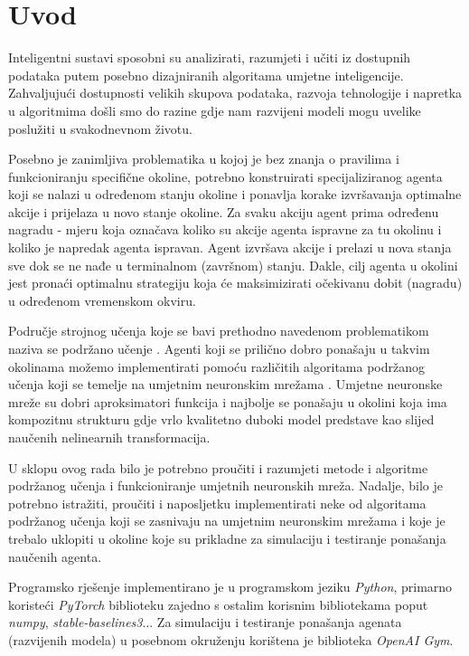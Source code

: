 \chapter{Uvod}
Inteligentni sustavi sposobni su analizirati, razumjeti i učiti iz dostupnih podataka putem posebno dizajniranih algoritama umjetne inteligencije. Zahvaljujući dostupnosti velikih skupova podataka, razvoja tehnologije i napretka u algoritmima došli smo do razine gdje nam razvijeni modeli mogu uvelike poslužiti u svakodnevnom životu.

Posebno je zanimljiva problematika u kojoj je bez znanja o pravilima i funkcioniranju specifične okoline, potrebno konstruirati specijaliziranog agenta koji se nalazi u određenom stanju okoline i ponavlja korake izvršavanja optimalne akcije i prijelaza u novo stanje okoline. Za svaku akciju agent prima određenu nagradu - mjeru koja označava koliko su akcije agenta ispravne za tu okolinu i koliko je napredak agenta ispravan. Agent izvršava akcije i prelazi u nova stanja sve dok se ne nađe u terminalnom (završnom) stanju. Dakle, cilj agenta u okolini jest pronaći optimalnu strategiju koja će maksimizirati očekivanu dobit (nagradu) u određenom vremenskom okviru.

Područje strojnog učenja koje se bavi prethodno navedenom problematikom naziva se podržano učenje . Agenti koji se prilično dobro ponašaju u takvim okolinama možemo implementirati pomoću različitih algoritama podržanog učenja koji se temelje na umjetnim neuronskim mrežama . Umjetne neuronske mreže su dobri aproksimatori funkcija i najbolje se ponašaju u okolini koja ima kompozitnu strukturu gdje vrlo kvalitetno duboki model predstave kao slijed naučenih nelinearnih transformacija.

U sklopu ovog rada bilo je potrebno proučiti i razumjeti metode i algoritme podržanog učenja i funkcioniranje umjetnih neuronskih mreža. Nadalje, bilo je potrebno istražiti, proučiti i naposljetku implementirati neke od algoritama podržanog učenja koji se zasnivaju na umjetnim neuronskim mrežama i koje je trebalo uklopiti u okoline koje su prikladne za simulaciju i testiranje ponašanja naučenih agenta.

Programsko rješenje implementirano je u programskom jeziku \textit{Python}, primarno koristeći \textit{PyTorch} biblioteku  zajedno s ostalim korisnim bibliotekama poput \textit{numpy}, \textit{stable-baselines3}... Za simulaciju i testiranje ponašanja agenata (razvijenih modela) u posebnom okruženju korištena je biblioteka \textit{OpenAI Gym}. 
